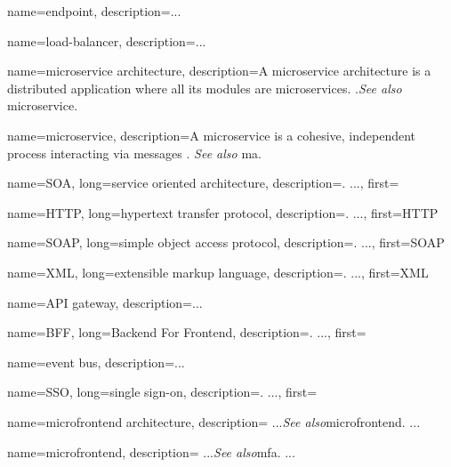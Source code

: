 {
    name=endpoint,
    description={...} %
}

{
    name=load-balancer,
    description={...} %
}

{
    name=microservice architecture,
    description={A microservice architecture is a distributed application where
    all its modules are microservices. \autocite{Dragoni_etal_2017}.\textit{See
    also} \gls{microservice}.} %
}

{
    name=microservice,
    description={A microservice is a cohesive, independent process interacting
    via messages \autocite{Dragoni_etal_2017}. \textit{See also} \gls{ma}.} %
}

{
    name=SOA,
    long={service oriented architecture},
    description={. ...},%
    first=
}

{
    name=HTTP,
    long={hypertext transfer protocol},
    description={. ...},%
    first=HTTP %
}

{
    name=SOAP,
    long={simple object access protocol},
    description={. ...},%
    first=SOAP
}

{
    name=XML,
    long={extensible markup language},
    description={. ...},%
    first=XML
}


{
    name=API gateway,
    description={...} %
}


{
    name=BFF,
    long={Backend For Frontend},
    description={. ...},%
    first=
}

{
    name=event bus,
    description={...} %
}

{
    name=SSO,
    long={single sign-on},
    description={. ...},%
    first=
}

{
    name=microfrontend architecture, 
    description={
        ...\textit{See also}\gls{microfrontend}. ...%
    }
         
}

{
    name=microfrontend, 
    description={
        ...\textit{See also}\gls{mfa}. ...%
    }
         
}

